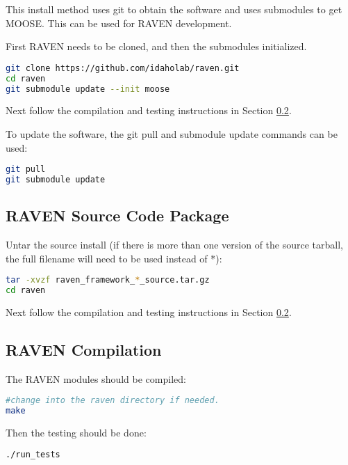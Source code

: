 This install method uses git to obtain the software and uses
submodules to get MOOSE.  This can be used for RAVEN development.

First RAVEN needs to be cloned, and then the submodules initialized.

\begin{lstlisting}[language=bash]
git clone https://github.com/idaholab/raven.git
cd raven
git submodule update --init moose
\end{lstlisting}

Next follow the compilation and testing instructions in Section \ref{raven_compilation}.

To update the software, the git pull and submodule update commands can
be used:

\begin{lstlisting}[language=bash]
git pull
git submodule update
\end{lstlisting}


\subsection{RAVEN Source Code Package}
\label{raven_source_package}

Untar the source install (if there is more than one version of the
source tarball, the full filename will need to be used instead of *):

\begin{lstlisting}[language=bash]
tar -xvzf raven_framework_*_source.tar.gz
cd raven
\end{lstlisting}

Next follow the compilation and testing instructions in Section
\ref{raven_compilation}.

\subsection{RAVEN Compilation}
\label{raven_compilation}

The RAVEN modules should be compiled:

\begin{lstlisting}[language=bash]
#change into the raven directory if needed.
make
\end{lstlisting}

Then the testing should be done:

\begin{lstlisting}[language=bash]
./run_tests
\end{lstlisting}

